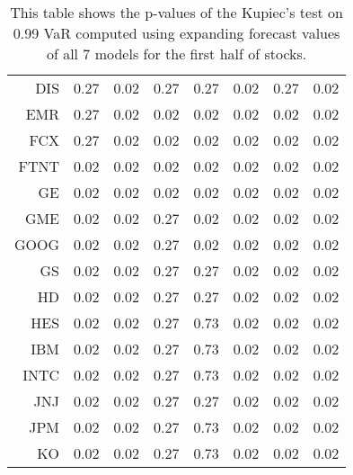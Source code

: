 \begin{table}[ht]
\begin{tabular}{rrrrrrrr}
  DIS & 0.27 & 0.02 & 0.27 & 0.27 & 0.02 & 0.27 & 0.02 \\ 
  EMR & 0.27 & 0.02 & 0.02 & 0.02 & 0.02 & 0.02 & 0.02 \\ 
  FCX & 0.27 & 0.02 & 0.02 & 0.02 & 0.02 & 0.02 & 0.02 \\ 
  FTNT & 0.02 & 0.02 & 0.02 & 0.02 & 0.02 & 0.02 & 0.02 \\ 
  GE & 0.02 & 0.02 & 0.02 & 0.02 & 0.02 & 0.02 & 0.02 \\ 
  GME & 0.02 & 0.02 & 0.27 & 0.02 & 0.02 & 0.02 & 0.02 \\ 
  GOOG & 0.02 & 0.02 & 0.27 & 0.02 & 0.02 & 0.02 & 0.02 \\ 
  GS & 0.02 & 0.02 & 0.27 & 0.27 & 0.02 & 0.02 & 0.02 \\ 
  HD & 0.02 & 0.02 & 0.27 & 0.27 & 0.02 & 0.02 & 0.02 \\ 
  HES & 0.02 & 0.02 & 0.27 & 0.73 & 0.02 & 0.02 & 0.02 \\ 
  IBM & 0.02 & 0.02 & 0.27 & 0.73 & 0.02 & 0.02 & 0.02 \\ 
  INTC & 0.02 & 0.02 & 0.27 & 0.73 & 0.02 & 0.02 & 0.02 \\ 
  JNJ & 0.02 & 0.02 & 0.27 & 0.27 & 0.02 & 0.02 & 0.02 \\ 
  JPM & 0.02 & 0.02 & 0.27 & 0.73 & 0.02 & 0.02 & 0.02 \\ 
  KO & 0.02 & 0.02 & 0.27 & 0.73 & 0.02 & 0.02 & 0.02 \\ 
   \hline
\end{tabular}
\caption[Kupiec's test p-values, alpha =0.99 (1)]{This table shows the p-values of the Kupiec's test on 0.99 VaR computed using expanding forecast values of all 7 models for the first half of stocks.} 
\label{Table:Kupiec_test_expanding_0.99_1}
\end{table}

